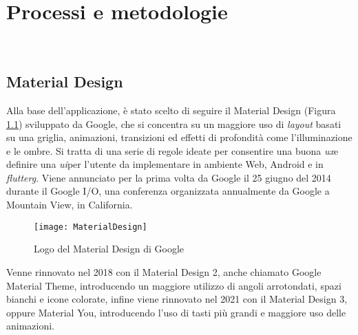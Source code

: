 \chapter{Processi e metodologie}
\label{cap:processi-metodologie}

\\

\section{Material Design}
Alla base dell'applicazione, è stato scelto di seguire il Material Design (Figura \ref{fig:material}) sviluppato da Google, che si concentra su un maggiore uso di \emph{layout} basati su una griglia, animazioni, transizioni ed effetti di profondità come l'illuminazione e le ombre.\newline
Si tratta di una serie di regole ideate per consentire una buona \emph{\gls{ux}}\glsfirstoccur e definire una \emph{\gls{ui}}\glsfirstoccur per l'utente da implementare in ambiente Web, Android e in \emph{\gls{flutterg}}.\newline
Viene annunciato per la prima volta da Google il 25 giugno del 2014 durante il Google I/O, una conferenza organizzata annualmente da Google a Mountain View, in California.\newline
\begin{figure}[!h] 
    \centering 
    \texttt{[image: MaterialDesign]} 
    \caption{Logo del Material Design di Google}\label{fig:material}
\end{figure}
\newline
Venne rinnovato nel 2018 con il Material Design 2, anche chiamato Google Material Theme, introducendo un maggiore utilizzo di angoli arrotondati, spazi bianchi e icone colorate, infine viene rinnovato nel 2021 con il Material Design 3, oppure Material You, introducendo l'uso di tasti più grandi e maggiore uso delle animazioni.\newline

